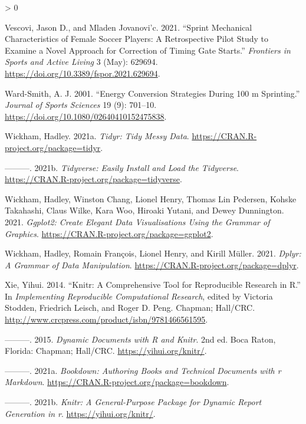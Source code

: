 \documentclass[fleqn,10pt]{wlpeerj} %
\newlength{\cslhangindent}
\newenvironment{CSLReferences}[2] %
 {%
  \setlength{\parindent}{0pt}
  \ifodd #1 \everypar{\setlength{\hangindent}{\cslhangindent}}\ignorespaces\fi
  \ifnum #2 > 0
  \setlength{\parskip}{#2\baselineskip}
  \fi
 }%
 {}
\begin{document}
\begin{CSLReferences}{1}{0}
\leavevmode\hypertarget{ref-vescoviSprintMechanicalCharacteristics2021}{}%
Vescovi, Jason D., and Mladen Jovanovi'c. 2021. {``Sprint {Mechanical Characteristics} of {Female Soccer Players}: {A Retrospective Pilot Study} to {Examine} a {Novel Approach} for {Correction} of {Timing Gate Starts}.''} \emph{Frontiers in Sports and Active Living} 3 (May): 629694. \url{https://doi.org/10.3389/fspor.2021.629694}.

\leavevmode\hypertarget{ref-ward-smithEnergyConversionStrategies2001}{}%
Ward-Smith, A. J. 2001. {``Energy Conversion Strategies During 100 m Sprinting.''} \emph{Journal of Sports Sciences} 19 (9): 701--10. \url{https://doi.org/10.1080/02640410152475838}.

\leavevmode\hypertarget{ref-R-tidyr}{}%
Wickham, Hadley. 2021a. \emph{Tidyr: Tidy Messy Data}. \url{https://CRAN.R-project.org/package=tidyr}.

\leavevmode\hypertarget{ref-R-tidyverse}{}%
---------. 2021b. \emph{Tidyverse: Easily Install and Load the Tidyverse}. \url{https://CRAN.R-project.org/package=tidyverse}.

\leavevmode\hypertarget{ref-R-ggplot2}{}%
Wickham, Hadley, Winston Chang, Lionel Henry, Thomas Lin Pedersen, Kohske Takahashi, Claus Wilke, Kara Woo, Hiroaki Yutani, and Dewey Dunnington. 2021. \emph{Ggplot2: Create Elegant Data Visualisations Using the Grammar of Graphics}. \url{https://CRAN.R-project.org/package=ggplot2}.

\leavevmode\hypertarget{ref-R-dplyr}{}%
Wickham, Hadley, Romain François, Lionel Henry, and Kirill Müller. 2021. \emph{Dplyr: A Grammar of Data Manipulation}. \url{https://CRAN.R-project.org/package=dplyr}.

\leavevmode\hypertarget{ref-knitr2014}{}%
Xie, Yihui. 2014. {``Knitr: A Comprehensive Tool for Reproducible Research in {R}.''} In \emph{Implementing Reproducible Computational Research}, edited by Victoria Stodden, Friedrich Leisch, and Roger D. Peng. Chapman; Hall/CRC. \url{http://www.crcpress.com/product/isbn/9781466561595}.

\leavevmode\hypertarget{ref-knitr2015}{}%
---------. 2015. \emph{Dynamic Documents with {R} and Knitr}. 2nd ed. Boca Raton, Florida: Chapman; Hall/CRC. \url{https://yihui.org/knitr/}.

\leavevmode\hypertarget{ref-R-bookdown}{}%
---------. 2021a. \emph{Bookdown: Authoring Books and Technical Documents with r Markdown}. \url{https://CRAN.R-project.org/package=bookdown}.

\leavevmode\hypertarget{ref-R-knitr}{}%
---------. 2021b. \emph{Knitr: A General-Purpose Package for Dynamic Report Generation in r}. \url{https://yihui.org/knitr/}.


\end{CSLReferences}
\end{document}
